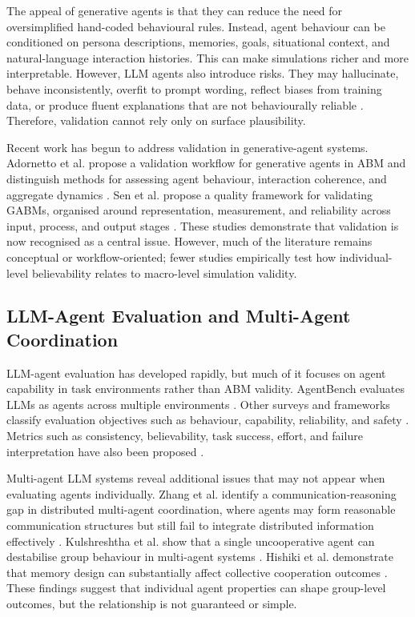 \documentclass[11pt]{article}
\begin{document}
The appeal of generative agents is that they can reduce the need for oversimplified hand-coded behavioural rules. Instead, agent behaviour can be conditioned on persona descriptions, memories, goals, situational context, and natural-language interaction histories. This can make simulations richer and more interpretable. However, LLM agents also introduce risks. They may hallucinate, behave inconsistently, overfit to prompt wording, reflect biases from training data, or produce fluent explanations that are not behaviourally reliable \cite{larooij2025critical}. Therefore, validation cannot rely only on surface plausibility.

Recent work has begun to address validation in generative-agent systems. Adornetto et al. propose a validation workflow for generative agents in ABM and distinguish methods for assessing agent behaviour, interaction coherence, and aggregate dynamics \cite{adornetto2025overview}. Sen et al. propose a quality framework for validating GABMs, organised around representation, measurement, and reliability across input, process, and output stages \cite{sen2025validating}. These studies demonstrate that validation is now recognised as a central issue. However, much of the literature remains conceptual or workflow-oriented; fewer studies empirically test how individual-level believability relates to macro-level simulation validity.

\subsection{LLM-Agent Evaluation and Multi-Agent Coordination}
LLM-agent evaluation has developed rapidly, but much of it focuses on agent capability in task environments rather than ABM validity. AgentBench evaluates LLMs as agents across multiple environments \cite{li2024agentbench}. Other surveys and frameworks classify evaluation objectives such as behaviour, capability, reliability, and safety \cite{mohammadi2025evaluation}. Metrics such as consistency, believability, task success, effort, and failure interpretation have also been proposed \cite{chen2024evaluating, barkur2024magenta, sung2025verila}.

Multi-agent LLM systems reveal additional issues that may not appear when evaluating agents individually. Zhang et al. identify a communication-reasoning gap in distributed multi-agent coordination, where agents may form reasonable communication structures but still fail to integrate distributed information effectively \cite{zhang2026silo}. Kulshreshtha et al. show that a single uncooperative agent can destabilise group behaviour in multi-agent systems \cite{kulshreshtha2026defection}. Hishiki et al. demonstrate that memory design can substantially affect collective cooperation outcomes \cite{hishiki2026memory}. These findings suggest that individual agent properties can shape group-level outcomes, but the relationship is not guaranteed or simple.
\end{document}
